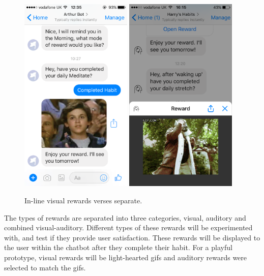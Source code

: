 \begin{figure}[H]
  \centering
  \includegraphics[width=2.1in]{../resources/design/reward-visual-inline.png}
  \hspace{10px}
  \includegraphics[width=2.1in]{../resources/design/reward-visual-2.png}
  \caption{In-line visual rewards verses separate.}
  \label{fig:rewards_inline_v_website}
\end{figure}

The types of rewards are separated into three categories, visual, auditory and combined visual-auditory. Different types of these rewards will be experimented with,
and test if they provide user satisfaction. These rewards will be displayed to the user within the chatbot after they complete their habit.
For a playful prototype, visual rewards will be light-hearted gifs and auditory rewards were selected to match the gifs.


